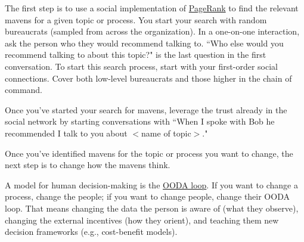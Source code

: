 The first step is to use a social implementation of \href{https://en.wikipedia.org/wiki/PageRank}{PageRank}
to find the relevant mavens for a given topic or process. You start your search with random bureaucrats (sampled from across the organization). In a one-on-one interaction, ask the person who they would recommend talking to.
``Who else would you recommend talking to about this topic?" is the last question in the first conversation.
To start this search process, start with your first-order social connections. Cover both low-level bureaucrats and those higher in the chain of command.

Once you've started your search for mavens, leverage the trust already in the social network by starting conversations with ``When I spoke with Bob he recommended I talk to you about $<$name of topic$>$."


Once you've identified mavens for the topic or process you want to change, the next step is to change how the mavens think. 

A model for human decision-making is the 
\href{https://en.wikipedia.org/wiki/OODA_loop}{OODA loop}.
If you want to change a process, change the people; if you want to change people, change their OODA loop. That means changing the data the person is aware of (what they observe), changing the external incentives (how they orient), and teaching them new decision frameworks (e.g., cost-benefit models).



